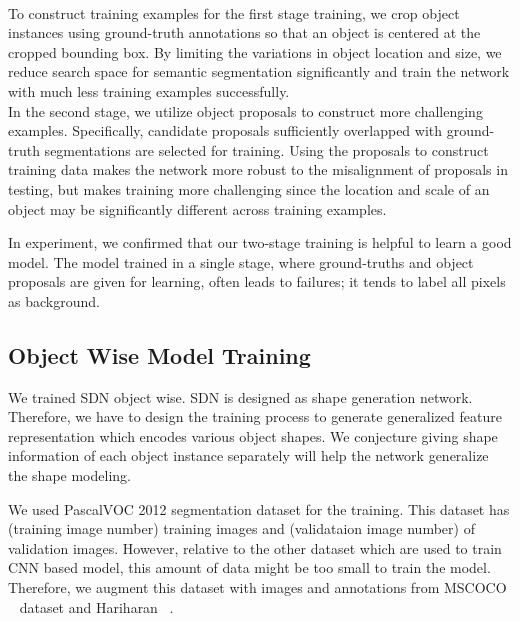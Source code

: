 \documentclass[10pt,twocolumn,letterpaper]{article}
\begin{document}
\ifdefined{} \\ \fi
To construct training examples for the first stage training, we crop object instances using ground-truth annotations so that an object is centered at the cropped bounding box.
By limiting the variations in object location and size, we reduce search space for semantic segmentation significantly and train the network with much less training examples successfully.
\ifdefined{} \\ \fi
In the second stage, we utilize object proposals to construct more challenging examples.
Specifically, candidate proposals sufficiently overlapped with ground-truth segmentations are selected for training. 
Using the proposals to construct training data makes the network more robust to the misalignment of proposals in testing, but makes training more challenging since the location and scale of an object may be significantly different across training examples.


\iffalse
\ifdefined\paratitle {\color{blue} [Discussion--two stage training is effective to find good solution]} \\ \fi
{\color{red}
In experiment, we confirmed that our two-stage training is helpful to learn a good model.
The model trained in a single stage, where ground-truths and object proposals are given for learning, often leads to failures; it tends to label all pixels as background.
}
\fi


\iffalse
\subsection{Object Wise Model Training}
We trained SDN object wise. 
SDN is designed as shape generation network. 
Therefore, we have to design the training process to generate generalized feature representation which encodes various object shapes. 
We conjecture giving shape information of each object instance separately will help the network generalize the shape modeling. 


\iffalse
We used PascalVOC 2012 segmentation dataset for the training. 
This dataset has (training image number) training images and (validataion image number) of validation images. 
However, relative to the other dataset which are used to train CNN based model, this amount of data might be too small to train the model. 
Therefore, we augment this dataset with images and annotations from MSCOCO ~\cite{Mscoco} dataset and Hariharan \etal ~\cite{Hariharan}. 
\end{document}
